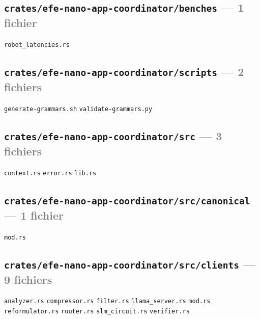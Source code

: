 \documentclass[10pt]{report}
\newcommand{\code}[1]{\texttt{\small #1}}
\begin{document}
\subsection*{\code{crates/efe-nano-app-coordinator/benches} \normalfont\textcolor{grey}{--- 1 fichier}}
\begin{sloppypar}\footnotesize\raggedright
\code{robot\_latencies.rs}
\end{sloppypar}

\subsection*{\code{crates/efe-nano-app-coordinator/scripts} \normalfont\textcolor{grey}{--- 2 fichiers}}
\begin{sloppypar}\footnotesize\raggedright
\code{generate-grammars.sh} \;\textbullet\; \code{validate-grammars.py}
\end{sloppypar}

\subsection*{\code{crates/efe-nano-app-coordinator/src} \normalfont\textcolor{grey}{--- 3 fichiers}}
\begin{sloppypar}\footnotesize\raggedright
\code{context.rs} \;\textbullet\; \code{error.rs} \;\textbullet\; \code{lib.rs}
\end{sloppypar}

\subsection*{\code{crates/efe-nano-app-coordinator/src/canonical} \normalfont\textcolor{grey}{--- 1 fichier}}
\begin{sloppypar}\footnotesize\raggedright
\code{mod.rs}
\end{sloppypar}

\subsection*{\code{crates/efe-nano-app-coordinator/src/clients} \normalfont\textcolor{grey}{--- 9 fichiers}}
\begin{sloppypar}\footnotesize\raggedright
\code{analyzer.rs} \;\textbullet\; \code{compressor.rs} \;\textbullet\; \code{filter.rs} \;\textbullet\; \code{llama\_server.rs} \;\textbullet\; \code{mod.rs} \;\textbullet\; \code{reformulator.rs} \;\textbullet\; \code{router.rs} \;\textbullet\; \code{slm\_circuit.rs} \;\textbullet\; \code{verifier.rs}
\end{sloppypar}
\end{document}
